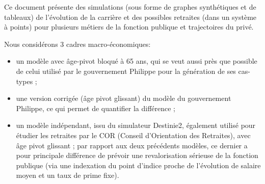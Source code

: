 

Ce document présente des simulations (sous forme de graphes synthétiques et de tableaux) de l'évolution de la carrière et des possibles retraites (dans un système à points) pour plusieurs métiers de la fonction publique et trajectoires du privé.

\vspace{.2cm}

Nous considérons 3 cadres macro-économiques:
\begin{itemize}
\item un modèle avec âge-pivot bloqué à 65 ans, qui se veut aussi près que possible de celui utilisé par le gouvernement Philippe pour la génération de ses cas-types ;
\item une version corrigée (âge pivot glissant) du modèle du gouvernement Philippe, ce qui permet de quantifier la différence ;
\item un modèle indépendant, issu du simulateur Destinie2, également utilisé pour étudier les retraites par le COR (Conseil d'Orientation des Retraites), avec  âge pivot glissant ; par rapport aux deux précédents modèles, ce dernier a pour principale différence de prévoir une revalorisation sérieuse de la fonction publique (via une indexation du point d'indice proche de l'évolution de salaire moyen et un taux de prime fixe).
\end{itemize}


\vspace{.2cm}

